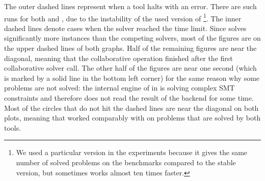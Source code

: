 The outer dashed lines represent when a tool halts with an error. There are such runs for both \racer{} and \theringenCICI{}, due to the instability of the used version of \racer{}\footnote{We used a particular version in the experiments because it gives the same number of solved problems on the benchmarks compared to the stable version, but sometimes works almost ten times faster.}. The inner dashed lines denote cases when the solver reached the time limit. Since \theringenCICI{} solves significantly more instances than the competing solvers, most of the figures are on the upper dashed lines of both graphs. Half of the remaining figures are near the diagonal, meaning that the collaborative operation finished after the first collaborative solver call. The other half of the figures are near one second (which is marked by a solid line in the bottom left corner) for the same reason why some problems are not solved: the internal engine of \racer{} in \theringenCICI{} is solving complex SMT constraints and therefore does not read the result of the backend for some time. Most of the circles that do not hit the dashed lines are near the diagonal on both plots, meaning that \theringenCICI{} worked comparably with \racer{} on problems that are solved by both tools.

